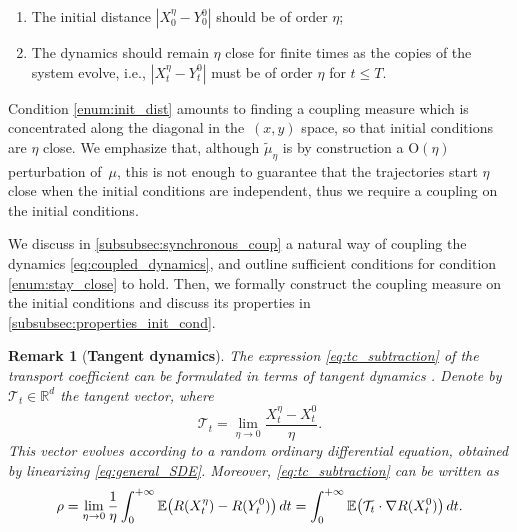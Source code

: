 \documentclass[11pt]{article}
\newcommand{\E}{\mathbb{E}}
\newcommand{\R}{\mathbb{R}}
\newcommand{\bigO}{\mathrm{O}}
\renewcommand{\leq}{\leqslant}
\DeclarePairedDelimiter\paren{\lparen}{\rparen}
\newtheorem{remark}{Remark}
\theoremstyle{definition}
\newcommand{\psip}{\widetilde{\mu}_\eta}
\begin{document}
\begin{enumerate}
	\item \label{enum:init_dist} The initial distance $|X_0^\eta - Y_0^0|$ should be of order $\eta$;
	\item \label{enum:stay_close} The dynamics should remain $\eta$ close for finite times as the copies of the system evolve, i.e., $|X_t^\eta - Y_t^0|$ must be of order $\eta$ for $t\leq T$.
\end{enumerate}
Condition \ref{enum:init_dist} amounts to finding a coupling measure which is concentrated along the diagonal in the~$(x,y)$ space, so that initial conditions are $\eta$ close. We emphasize that, although $\psip$ is by construction a $\bigO(\eta)$ perturbation of~$\mu$, this is not enough to guarantee that the trajectories start $\eta$ close when the initial conditions are independent, thus we require a coupling on the initial conditions.

 We discuss in \cref{subsubsec:synchronous_coup} a natural way of coupling the dynamics \eqref{eq:coupled_dynamics}, and outline sufficient conditions for condition \ref{enum:stay_close} to hold. Then, we formally construct the coupling measure on the initial conditions and discuss its properties in \cref{subsubsec:properties_init_cond}.
 
\begin{remark}[{\bf Tangent dynamics}]
The expression \eqref{eq:tc_subtraction} of the transport coefficient can be formulated in terms of tangent dynamics \cite{assaraf2017}. Denote by $\mathcal{T}_t\in\R^d$ the tangent vector, where
\begin{equation}
	\mathcal{T}_t 
= \lim_{\eta\to 0} \frac{X_t^\eta - X_t^0}{\eta}.
\end{equation} 
This vector evolves according to a random ordinary differential equation, obtained by linearizing \eqref{eq:general_SDE}. Moreover,
\eqref{eq:tc_subtraction} can be written as
\begin{equation}
	\rho = \lim_{\eta\to 0} \frac{1}{\eta}\int_0^{+\infty} \E\paren*{R(X_t^\eta) - R(Y_t^0)} \, dt = \int_0^{+\infty} \E\paren*{\mathcal{T}_t\cdot \nabla R(X_t^0)} \, dt.
\end{equation}
\end{remark}
\end{document}
